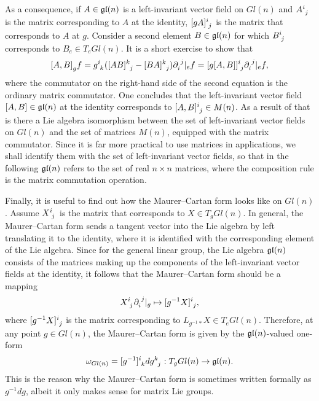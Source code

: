 \documentclass[
final,
11pt,
a4paper,
DIV=11,
headinclude=true,
footinclude=false,
bibliography=totoc,
twoside=true,  %
BCOR=5mm
]{scrbook}
\begin{document}
As a consequence, if $A \in \mathfrak{gl}(n)$ is a left-invariant 
vector field on $Gl(n)$ and $A\ind{^i_j}$ is the matrix 
corresponding to $A$ at the identity, $[gA]\ind{^i_j}$ is the 
matrix that corresponds to $A$ at $g$. Consider a second element 
$B \in \mathfrak{gl}(n)$ for which $B\ind{^i_j}$ corresponds to $B_e 
\in T_e Gl(n)$. It is a short exercise to show that
\begin{equation*}
  {[A,B]}_g f = g\ind{^i_k}([AB]\ind{^k_j} 
  - [BA]\ind{^k_j})\pd\ind{_i^j}|_e f
  = [g[A,B]]\ind{^i_j}\pd\ind{_i^j}|_e f,
\end{equation*}
where the commutator on the right-hand side of the second 
equation is the ordinary matrix commutator. One concludes that 
the left-invariant vector field $[A,B] \in \mathfrak{gl}(n)$ at the 
identity corresponds to $[A,B]\ind{^i_j} \in M(n)$. As a result 
of that is there a Lie algebra isomorphism between the set of 
left-invariant vector fields on $Gl(n)$ and the set of matrices 
$M(n)$, equipped with the matrix commutator. Since it is far more 
practical to use matrices in applications, we shall identify them 
with the set of left-invariant vector fields, so that in the 
following $\mathfrak{gl}(n)$ refers to the set of real $n \times n$ 
matrices, where the composition rule is the matrix commutation 
operation.

Finally, it is useful to find out how the Maurer--Cartan form 
looks like on $Gl(n)$. Assume $X\ind{^i_j}$ is the matrix that 
corresponds to $X \in T_g Gl(n)$. In general, the Maurer--Cartan 
form sends a tangent vector into the Lie algebra by left 
translating it to the identity, where it is identified with the 
corresponding element of the Lie algebra.  Since for the general 
linear group, the Lie algebra $\mathfrak{gl}(n)$ consists of the 
matrices making up the components of the left-invariant vector 
fields at the identity, it follows that the Maurer--Cartan form 
should be a mapping
\begin{equation*}
  X\ind{^i_j}\pd\ind{_i^j}|_g
  \mapsto [g^{-1}X]\ind{^i_j},
\end{equation*}
where $[g^{-1}X]\ind{^i_j}$ is the matrix corresponding to 
$L_{g^{-1}*}X \in T_e Gl(n)$. Therefore, at any point $g \in 
Gl(n)$, the Maurer--Cartan form is given by the 
$\mathfrak{gl}(n)$-valued one-form
\begin{equation}
  \omega_{Gl(n)} = [g^{-1}]\ind{^i_k}dg\ind{^k_j} : T_g Gl(n) \to 
  \mf{gl}(n).
\end{equation}
This is the reason why the Maurer--Cartan form is sometimes 
written formally as $g^{-1}dg$, albeit it only makes sense for 
matrix Lie groups.
\end{document}

